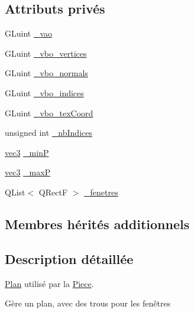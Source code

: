 \subsection*{Attributs privés}
\begin{DoxyCompactItemize}
\item 
G\+Luint \hyperlink{class_plan_ab4efe8532b73dd0efca80000afb0027d}{\+\_\+vao}
\item 
G\+Luint \hyperlink{class_plan_a7b203dc36964da663836cf7614fe711a}{\+\_\+vbo\+\_\+vertices}
\item 
G\+Luint \hyperlink{class_plan_aa5db33661be2dfcecf68683c33eb22b9}{\+\_\+vbo\+\_\+normals}
\item 
G\+Luint \hyperlink{class_plan_ad8791ad67d66ac1b24792dc72ec00c64}{\+\_\+vbo\+\_\+indices}
\item 
G\+Luint \hyperlink{class_plan_a3c16becd29f35260b79af8b9cb6fa892}{\+\_\+vbo\+\_\+tex\+Coord}
\item 
unsigned int \hyperlink{class_plan_a7f9ccd3bc05e2d3682ecc26326bde71f}{\+\_\+nb\+Indices}
\item 
\hyperlink{structvec3}{vec3} \hyperlink{class_plan_aad9837a269e87fa5d7a4a5fc90abf3e7}{\+\_\+min\+P}
\item 
\hyperlink{structvec3}{vec3} \hyperlink{class_plan_a2dce54e58d00f40ed8da5c9bd34c1232}{\+\_\+max\+P}
\item 
Q\+List$<$ Q\+Rect\+F $>$ \hyperlink{class_plan_aa9fdbf8efac3f80ffd8bb2f789e7f4f2}{\+\_\+fenetres}
\end{DoxyCompactItemize}
\subsection*{Membres hérités additionnels}


\subsection{Description détaillée}
\hyperlink{class_plan}{Plan} utilisé par la \hyperlink{class_piece}{Piece}. 

Gère un plan, avec des trous pour les fenêtres 

